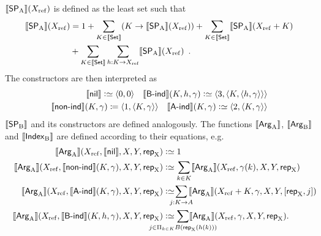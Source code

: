 \documentclass{article}
\begin{document}
$\llbracket \mathsf{SP}_{\mathrm{A}} \rrbracket(X_{\mathrm{ref}})$ is defined as the least set such that
\begin{align*}
\llbracket \mathsf{SP}_{\mathrm{A}} \rrbracket(X_{\mathrm{ref}}) &= 1 + \sum_{K \in \llbracket \mathsf{Set} \rrbracket}(K \to \llbracket \mathsf{SP}_{\mathrm{A}} \rrbracket(X_{\mathrm{ref}}))
  + \sum_{K \in \llbracket \mathsf{Set} \rrbracket}\llbracket \mathsf{SP}_{\mathrm{A}} \rrbracket(X_{\mathrm{ref}} + K) \\
 & {} + \sum_{K \in \llbracket \mathsf{Set} \rrbracket}\sum_{h : K \to X_{\mathrm{ref}}}\llbracket \mathsf{SP}_{\mathrm{A}} \rrbracket(X_{\mathrm{ref}}) \enspace .
\end{align*}
%
The constructors are then interpreted as
%
\begin{align*}
 \llbracket \mathsf{nil} \rrbracket \mathrel{\mathop:}\simeq \langle 0, 0\rangle \quad
 \llbracket \mathsf{B}\text{-}\mathsf{ind} \rrbracket(K, h, \gamma) \mathrel{\mathop:}\simeq \langle 3 , \langle K, \langle h, \gamma \rangle\rangle\rangle
   \\
  \llbracket \mathsf{non}\text{-}\mathsf{ind} \rrbracket(K, \gamma) \coloneqq \langle 1 , \langle K, \gamma
  \rangle\rangle \quad \llbracket \mathsf{A}\text{-}\mathsf{ind} \rrbracket(K, \gamma) \mathrel{\mathop:}\simeq \langle 2 , \langle K, \gamma \rangle\rangle
\end{align*}
$\llbracket \mathsf{SP}_{\mathrm{B}} \rrbracket$ and its constructors are defined analogously. The
functions $\llbracket \mathsf{Arg}_{\mathrm{A}} \rrbracket$, $\llbracket \mathsf{Arg}_{\mathrm{B}} \rrbracket$ and $\llbracket \mathsf{Index}_{\mathrm{B}} \rrbracket$ are defined
according to their equations, e.g.\
\begin{align*}
  \sem{\ArgA}(\Xref, \sem{\nilA}, X, Y, \repA) &\colonsimeq 1 \\
\sem{\ArgA}(\Xref, \sem{\nonindA}(K, \gamma), X, Y, \repA) &\colonsimeq
  \sum_{k \in K} \sem{\ArgA}(\Xref, \gamma(k), X, Y, \repA) \\
\sem{\ArgA}(\Xref, \sem{\AindA}(K, \gamma), X, Y, \repA) &\colonsimeq\!\!\!\!\!
  \sum_{j : K \to A}\!\!\!\sem{\ArgA}(\Xref + K, \gamma, X, Y, [\repA, j])\!\!\!\!\!\!\!\! \\
\sem{\ArgA}(\Xref, \sem{\BindA}(K, h, \gamma), X, Y, \repA) &\colonsimeq
  \sum_{\mathclap{j \in \Pi_{k \in K} B(\repA (h(k)))}}\sem{\ArgA}(\Xref, \gamma, X, Y, \repA).
\end{align*}
\end{document}
